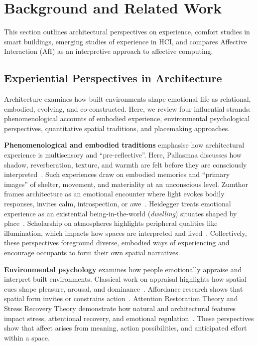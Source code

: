 \section{Background and Related Work}
\label{sec:ch3-related-work}
This section outlines architectural perspectives on experience, comfort studies in smart buildings, emerging studies of experience in HCI, and compares Affective Interaction (AfI) as an interpretive approach to affective computing. 

\subsection{Experiential Perspectives in Architecture}
\label{subsec:ch3-architecture-experience}
Architecture examines how built environments shape emotional life as relational, embodied, evolving, and co-constructed. Here, we review four influential strands: phenomenological accounts of embodied experience, environmental psychological perspectives, quantitative spatial traditions, and placemaking approaches.

\textbf{Phenomenological and embodied traditions} emphasise how architectural experience is multisensory and ``pre-reflective''. Here, Pallasmaa discusses how shadow, reverberation, texture, and warmth are felt before they are consciously interpreted~\cite{pallasmaa2024eyes}. Such experiences draw on embodied memories and ``primary images'' of shelter, movement, and materiality at an unconscious level. Zumthor frames architecture as an emotional encounter where light evokes bodily responses, invites calm, introspection, or awe~\cite{zumthor2006atmospheres}. Heidegger treats emotional experience as an existential being-in-the-world (\textit{dwelling}) situates shaped by place~\cite{heidegger1971building}. Scholarship on atmospheres highlights peripheral qualities like illumination, which impacts how spaces are interpreted and lived~\cite{zajonc1993catching, griffero2016atmospheres}. Collectively, these perspectives foreground diverse, embodied ways of experiencing and encourage occupants to form their own spatial narratives.

\textbf{Environmental psychology} examines how people emotionally appraise and interpret built environments. Classical work on appraisal highlights how spatial cues shape pleasure, arousal, and dominance~\cite{mehrabian1974approach}. Affordance research shows that spatial form invites or constrains action~\cite{vilar2012using}. Attention Restoration Theory and Stress Recovery Theory demonstrate how natural and architectural features impact stress, attentional recovery, and emotional regulation~\cite{basu2019attention, ulrich1991stress}. These perspectives show that affect arises from meaning, action possibilities, and anticipated effort within a space.

